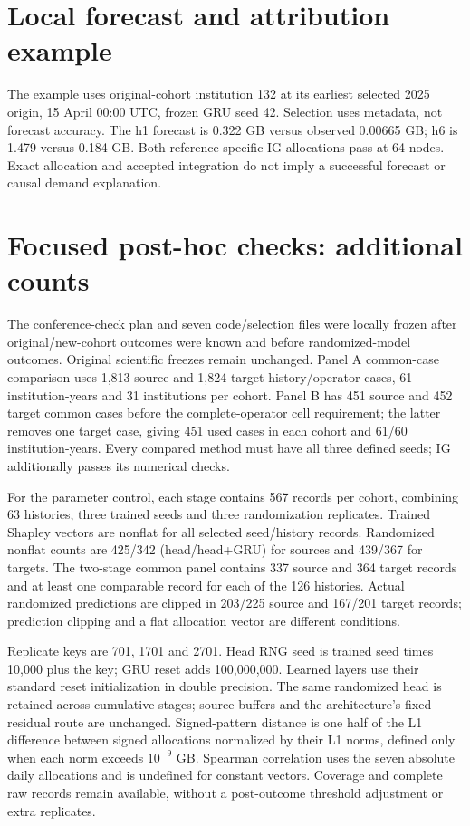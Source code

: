 \section{Local forecast and attribution example}
The example uses original-cohort institution 132 at its earliest selected 2025 origin, 15 April 00:00 UTC, frozen GRU seed 42. Selection uses metadata, not forecast accuracy. The h1 forecast is 0.322 GB versus observed 0.00665 GB; h6 is 1.479 versus 0.184 GB. Both reference-specific IG allocations pass at 64 nodes. Exact allocation and accepted integration do not imply a successful forecast or causal demand explanation.


\section{Focused post-hoc checks: additional counts}
The conference-check plan and seven code/selection files were locally frozen after original/new-cohort outcomes were known and before randomized-model outcomes. Original scientific freezes remain unchanged. Panel A common-case comparison uses 1,813 source and 1,824 target history/operator cases, 61 institution-years and 31 institutions per cohort. Panel B has 451 source and 452 target common cases before the complete-operator cell requirement; the latter removes one target case, giving 451 used cases in each cohort and 61/60 institution-years. Every compared method must have all three defined seeds; IG additionally passes its numerical checks.

For the parameter control, each stage contains 567 records per cohort, combining 63 histories, three trained seeds and three randomization replicates. Trained Shapley vectors are nonflat for all selected seed/history records. Randomized nonflat counts are 425/342 (head/head+GRU) for sources and 439/367 for targets. The two-stage common panel contains 337 source and 364 target records and at least one comparable record for each of the 126 histories. Actual randomized predictions are clipped in 203/225 source and 167/201 target records; prediction clipping and a flat allocation vector are different conditions.

Replicate keys are 701, 1701 and 2701. Head RNG seed is trained seed times 10,000 plus the key; GRU reset adds 100,000,000. Learned layers use their standard reset initialization in double precision. The same randomized head is retained across cumulative stages; source buffers and the architecture's fixed residual route are unchanged. Signed-pattern distance is one half of the L1 difference between signed allocations normalized by their L1 norms, defined only when each norm exceeds $10^{-9}$ GB. Spearman correlation uses the seven absolute daily allocations and is undefined for constant vectors. Coverage and complete raw records remain available, without a post-outcome threshold adjustment or extra replicates.

